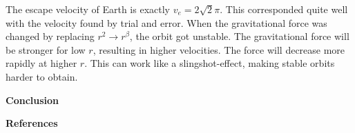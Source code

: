 \documentclass[10pt,a4paper]{article}
\begin{document}
\noindent The escape velocity of Earth is exactly $v_e=2\sqrt{2}\pi$. This corresponded quite well with the velocity found by trial and error. When the gravitational force was changed by replacing $r^2\rightarrow r^\beta$, the orbit got unstable. The gravitational force will be stronger for low $r$, resulting in higher velocities. The force will decrease more rapidly at higher $r$. This can work like a slingshot-effect, making stable orbits harder to obtain.  






\newpage
{\LARGE\bf
Conclusion
}









\newpage
{\LARGE\bf
References
}
\end{document}
